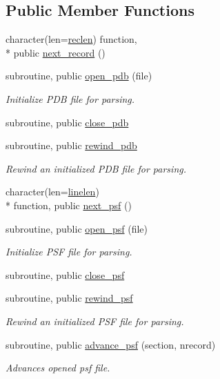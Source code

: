 \subsection*{Public Member Functions}
\begin{DoxyCompactItemize}
\item 
character(len=\hyperlink{classmolreader_a8f12be3272b946fd698c9fbaf2ba9d32}{reclen}) function, \\*
public \hyperlink{classmolreader_af6c857ef51f99971a66b1c293d24906b}{next\+\_\+record} ()
\item 
subroutine, public \hyperlink{classmolreader_a38a3903d901bc5e0b318bcc0dfd1b3ff}{open\+\_\+pdb} (file)
\begin{DoxyCompactList}\small\item\em Initialize P\+D\+B file for parsing. \end{DoxyCompactList}\item 
subroutine, public \hyperlink{classmolreader_a5aafbdb9b4afbb96bdc20ae58d547699}{close\+\_\+pdb}
\item 
subroutine, public \hyperlink{classmolreader_af85c66302e278af03e0cc94dc42e662e}{rewind\+\_\+pdb}
\begin{DoxyCompactList}\small\item\em Rewind an initialized P\+D\+B file for parsing. \end{DoxyCompactList}\item 
character(len=\hyperlink{classmolreader_acd493d996a1fcd0ed77937e925c9b7fe}{linelen}) \\*
function, public \hyperlink{classmolreader_ac6b85a406b7ebd0810f0d63beeeda783}{next\+\_\+psf} ()
\item 
subroutine, public \hyperlink{classmolreader_a3ebd81391f00e3279bf262b2879af97a}{open\+\_\+psf} (file)
\begin{DoxyCompactList}\small\item\em Initialize P\+S\+F file for parsing. \end{DoxyCompactList}\item 
subroutine, public \hyperlink{classmolreader_aac446b95d6c274d93e11e45286e60e4d}{close\+\_\+psf}
\item 
subroutine, public \hyperlink{classmolreader_a6d79c8d97fd91cfb25dec2b67320c77b}{rewind\+\_\+psf}
\begin{DoxyCompactList}\small\item\em Rewind an initialized P\+S\+F file for parsing. \end{DoxyCompactList}\item 
subroutine, public \hyperlink{classmolreader_a7a4cb6436916cd4b8ee0341d528e9c73}{advance\+\_\+psf} (section, nrecord)
\begin{DoxyCompactList}\small\item\em Advances opened psf file. \end{DoxyCompactList}\end{DoxyCompactItemize}
